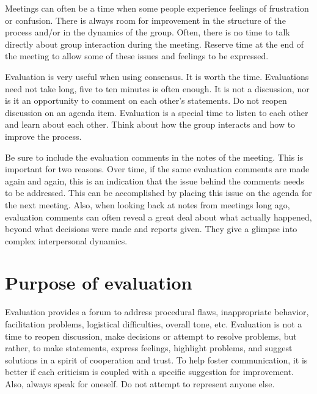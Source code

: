 Meetings can often be a time when some people experience feelings
of frustration or confusion. There is always room for improvement
in the structure of the process and/or in the dynamics of the
group. Often, there is no time to talk directly about group
interaction during the meeting. Reserve time at the end of the
meeting to allow some of these issues and feelings to be expressed.

Evaluation is very useful when using consensus. It is worth the
time. Evaluations need not take long, five to ten minutes is often
enough. It is not a discussion, nor is it an opportunity to
comment on each other's statements. Do not reopen discussion on an
agenda item. Evaluation is a special time to listen to each other
and learn about each other. Think about how the group interacts and
how to improve the process.

Be sure to include the evaluation comments in the notes of the
meeting. This is important for two reasons. Over time, if the same
evaluation comments are made again and again, this is an indication
that the issue behind the comments needs to be addressed. This can
be accomplished by placing this issue on the agenda for the next
meeting. Also, when looking back at notes from meetings long ago,
evaluation comments can often reveal a great deal about what
actually happened, beyond what decisions were made and
reports given. They give a glimpse into complex interpersonal
dynamics.

\section{Purpose of evaluation}

Evaluation provides a forum to address procedural flaws,
inappropriate behavior, facilitation problems, logistical
difficulties, overall tone, etc. Evaluation is not a time to reopen
discussion, make decisions or attempt to resolve problems, but
rather, to make statements, express feelings, highlight problems,
and suggest solutions in a spirit of cooperation and trust. To help
foster communication, it is better if each criticism is coupled
with a specific suggestion for improvement. Also, always speak for
oneself. Do not attempt to represent anyone else.

